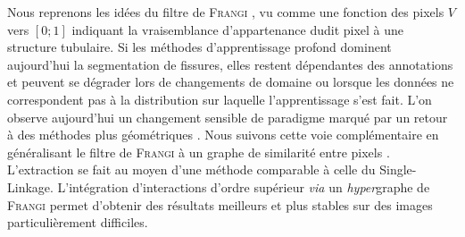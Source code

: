 \documentclass{these-ISSS} %
\begin{document}
\begin{enumerate}
    Nous reprenons les idées du filtre de \textsc{Frangi} \cite{Frangi1998}, vu comme une fonction des pixels $V $ vers $ [0 ; 1]$ indiquant la vraisemblance d'appartenance dudit pixel à une structure tubulaire.
    Si les méthodes d'apprentissage profond dominent aujourd'hui la segmentation de fissures, elles restent dépendantes des annotations et peuvent se dégrader lors de changements de domaine ou lorsque les données ne correspondent pas à la distribution sur laquelle l'apprentissage s'est fait. L'on observe aujourd'hui un changement sensible de paradigme marqué par un retour à des méthodes plus géométriques \cite{Zhang2025Review}. Nous suivons cette voie complémentaire %
    en généralisant le filtre de \textsc{Frangi} à un graphe de similarité entre pixels \cite{BibiStrasbourg,BibiISPRS}. L'extraction se fait au moyen d'une méthode comparable à celle du Single-Linkage. L'intégration d'interactions d'ordre supérieur \emph{via} un \emph{hyper}graphe de \textsc{Frangi} permet d'obtenir des résultats meilleurs et plus stables sur des images particulièrement difficiles.
\end{enumerate}












\end{document}
